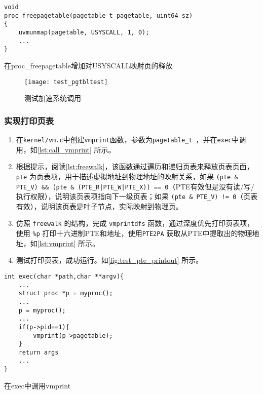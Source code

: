 {\begin{listing}[!htb]
	\begin{verbatim}
void
proc_freepagetable(pagetable_t pagetable, uint64 sz)
{
    uvmunmap(pagetable, USYSCALL, 1, 0);
    ...
}
	\end{verbatim}
	\caption{在proc\_freepagetable增加对USYSCALL映射页的释放}\label{lst:proc_freepagetable}
\end{listing}

\begin{figure}[!htb]
	\centering
	\texttt{[image: test\_pgtbltest]}
	\caption{测试加速系统调用}
	\label{fig:test_pgtbltest}
\end{figure}

\subsubsection{实现打印页表}

\begin{enumerate}
	\item 在\texttt{kernel/vm.c}中创建\texttt{vmprint}函数，参数为\texttt{pagetable\_t }，并在\texttt{exec}中调用，如\cref{lst:call_vmprint} 所示。
	\item 根据提示，阅读\cref{lst:freewalk}，该函数通过遍历和递归页表来释放页表页面，\texttt{pte} 为页表项，用于描述虚拟地址到物理地址的映射关系，如果 \texttt{(pte \& PTE\_V) \&\& (pte \& (PTE\_R|PTE\_W|PTE\_X)) == 0}（PTE有效但是没有读/写/执行权限），说明该页表项指向下一级页表；如果 \texttt{(pte \& PTE\_V) != 0}（页表有效），说明该页表是叶子节点，实际映射到物理页。
	\item 仿照 \texttt{freewalk} 的结构，完成 \texttt{vmprintdfs} 函数，通过深度优先打印页表项，使用 \texttt{\%p} 打印十六进制PTE和地址，使用\texttt{PTE2PA} 获取从PTE中提取出的物理地址，如\cref{lst:vmprint} 所示。
	\item 测试打印页表，成功运行。如\cref{fig:test_pte_printout} 所示。
\end{enumerate}

\begin{listing}[!htb]
	\begin{verbatim}
int exec(char *path,char **argv){
    ...
    struct proc *p = myproc();
    ...
    p = myproc();
    ...
    if(p->pid==1){
        vmprint(p->pagetable);
    }
    return args
    ...
}
	\end{verbatim}
	\caption{在exec中调用vmprint}\label{lst:call_vmprint}
\end{listing}

}
